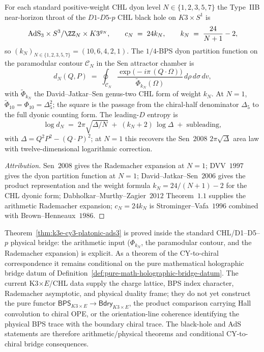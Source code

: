 \begin{theorem}
\label{thm:k3e-cy3-platonic-ads3}
For each standard positive-weight CHL dyon level
$N \in \{1, 2, 3, 5, 7\}$ the Type~IIB near-horizon throat of the
$D1$-$D5$-$p$ CHL black hole on $K3 \times S^1$ is
\[
 \mathrm{AdS}_3 \times S^3/\ZZ_N \times K3^{g_N}, \qquad c_N \;=\; 24 k_N, \qquad k_N \;=\; \frac{24}{N + 1} - 2,
\]
so $(k_N)_{N\in\{1,2,3,5,7\}}=(10,6,4,2,1)$. The $1/4$-BPS dyon partition function on the paramodular contour $\mathcal{C}_N$ in the Sen attractor chamber is
\[
 d_N(Q, P) \;=\; \oint_{\mathcal{C}_N} \frac{\exp\!\bigl(-i\pi\,(Q \cdot \Omega)\bigr)}{\widetilde{\Phi}_{k_N}(\Omega)}\,d\rho\,d\sigma\,dv,
\]
with $\widetilde{\Phi}_{k_N}$ the David--Jatkar--Sen genus-two CHL form of weight $k_N$. At \(N=1\), \(\widetilde{\Phi}_{10}=\Phi_{10}=\Delta_5^2\); the square is the passage from the chiral-half denominator \(\Delta_5\) to the full dyonic counting form. The leading-$D$ entropy is
\[
 \log d_N \;=\; 2\pi\sqrt{\Delta/N} \;+\; (k_N + 2)\,\log\Delta \;+\; \text{subleading},
\]
with $\Delta = Q^2 P^2 - (Q\cdot P)^2$; at $N = 1$ this recovers the Sen~$2008$ $2\pi\sqrt{\Delta}$ area law with twelve-dimensional logarithmic correction.
\end{theorem}

\begin{proof}[Attribution]
Sen~$2008$ gives the Rademacher expansion at $N = 1$; DVV~$1997$ gives the dyon partition function at $N = 1$; David--Jatkar--Sen~$2006$ gives the product representation and the weight formula $k_N = 24/(N+1) - 2$ for the CHL dyonic form; Dabholkar--Murthy--Zagier~$2012$ Theorem~$1.1$ supplies the arithmetic Rademacher expansion; $c_N = 24 k_N$ is Strominger--Vafa~$1996$ combined with Brown--Henneaux~$1986$.
\end{proof}

\begin{remark}
\label{rem:k3e-cy3-ads3-pure-math-bridge}
Theorem~\ref{thm:k3e-cy3-platonic-ads3} is proved inside the
standard CHL/D1--D5--$p$ physical bridge: the arithmetic input
($\Phi_{k_N}$, the paramodular contour, and the Rademacher expansion)
is explicit. As a theorem of the CY-to-chiral correspondence it remains
conditional on the pure mathematical holographic bridge datum of
Definition~\ref{def:pure-math-holographic-bridge-datum}. The current
K3$\times E$/CHL data supply the charge lattice, BPS index character,
Rademacher asymptotic, and physical duality frame; they do not yet
construct the pure functor
$\mathsf{BPS}_{K3\times E}\to\mathsf{Bdry}_{K3\times E}$, the product
comparison carrying Hall convolution to chiral OPE, or the
orientation-line coherence identifying the physical BPS trace with the
boundary chiral trace. The black-hole and AdS statements are therefore
arithmetic/physical theorems and conditional CY-to-chiral bridge
consequences.
\end{remark}

